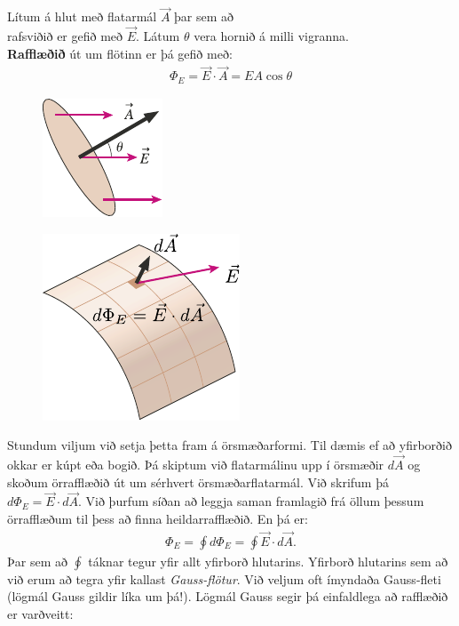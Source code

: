 \ifdefined \wholebook \else\documentclass[oneside]{book}\usepackage{EdlBook}\graphicspath{{figures/}}
\begin{document}
\begin{tcolorbox}
\begin{definition}
Lítum á hlut með flatarmál $\vec{A}$ þar sem að \\ rafsviðið er gefið með $\vec{E}$. Látum $\theta$ vera hornið á milli vigranna. \\ \textbf{Rafflæðið} út um flötinn er þá gefið með:
\begin{align*}
    \Phi_E = \vec{E} \cdot \vec{A} = EA\cos\theta
\end{align*}
\end{definition}
\vspace{-2.75cm}
\begin{figure}[H]
    \hspace{11cm}
    \includegraphics{rafflaedinn.pdf}
\end{figure}
\end{tcolorbox}

\vspace{0.2cm}

\begin{minipage}{\linewidth}

\begin{figure}
\vspace{0.4cm}
\centering
\includegraphics{figures/orsmaedarflaedi.pdf}
\end{figure}


Stundum viljum við setja þetta fram á örsmæðarformi. Til dæmis ef að yfirborðið okkar er kúpt eða bogið. Þá skiptum við flatarmálinu upp í örsmæðir $d\vec{A}$ og skoðum örrafflæðið út um sérhvert örsmæðarflatarmál. Við skrifum þá $d\Phi_E = \vec{E} \cdot d\vec{A}$. Við þurfum síðan að leggja saman framlagið frá öllum þessum örrafflæðum til þess að finna heildarrafflæðið. En þá er:
\begin{align*}
    \Phi_E = \oint d \Phi_E = \oint \vec{E} \cdot d\vec{A}.
\end{align*}
Þar sem að $\oint$ táknar tegur yfir allt yfirborð hlutarins. Yfirborð hlutarins sem að við erum að tegra yfir kallast \emph{Gauss-flötur}. Við veljum oft ímyndaða Gauss-fleti (lögmál Gauss gildir líka um þá!). Lögmál Gauss segir þá einfaldlega að rafflæðið er varðveitt:
\end{minipage}
\end{document}
